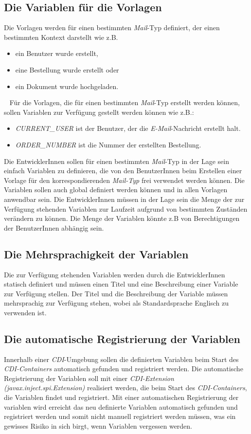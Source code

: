 \subsection{Die Variablen für die Vorlagen}
Die Vorlagen werden für einen bestimmten \emph{Mail}-Typ definiert, der einen bestimmten Kontext darstellt wie z.B.
\begin{itemize}
	\item ein Benutzer wurde erstellt,
	\item eine Bestellung wurde erstellt oder
	\item ein Dokument wurde hochgeladen.
\end{itemize}
\ \newline
Für die Vorlagen, die für einen bestimmten \emph{Mail}-Typ erstellt werden können, sollen Variablen zur Verfügung gestellt werden können wie z.B.:
\begin{itemize}
	\item \emph{CURRENT\_USER} ist der Benutzer, der die \emph{E-Mail}-Nachricht erstellt halt.
	\item \emph{ORDER\_NUMBER} ist die Nummer der erstellten Bestellung.
\end{itemize}
Die EntwicklerInnen sollen für einen bestimmten \emph{Mail}-Typ in der Lage sein einfach Variablen zu definieren, die von den BenutzerInnen beim Erstellen einer Vorlage für den korrespondierenden \emph{Mail-Typ} frei verwendet werden können. Die Variablen sollen auch global definiert werden können und in allen Vorlagen anwendbar sein. Die EntwicklerInnen müssen in der Lage sein die Menge der zur Verfügung stehenden Variablen zur Laufzeit aufgrund von bestimmten Zuständen verändern zu können. Die Menge der Variablen könnte z.B von Berechtigungen der BenutzerInnen abhängig sein.

\subsection{Die Mehrsprachigkeit der Variablen}
Die zur Verfügung stehenden Variablen werden durch die EntwicklerInnen statisch definiert und müssen einen Titel und eine Beschreibung einer Variable zur Verfügung stellen. Der Titel und die Beschreibung der Variable müssen mehrsprachig zur Verfügung stehen, wobei als Standardsprache Englisch zu verwenden ist.

\subsection{Die automatische Registrierung der Variablen}
Innerhalb einer \emph{CDI}-Umgebung sollen die definierten Variablen beim Start des \emph{CDI-Containers} automatisch gefunden und registriert werden. Die automatische Registrierung der Variablen soll mit einer \emph{CDI-Extension (javax.inject.spi.Extension)} realisiert werden, die beim Start des \emph{CDI-Containers}, die Variablen findet und registriert. Mit einer automatischen Registrierung der variablen wird erreicht das neu definierte Variablen automatisch gefunden und registriert werden und somit nicht manuell registriert werden müssen, was ein gewisses Risiko in sich birgt, wenn Variablen vergessen werden.

